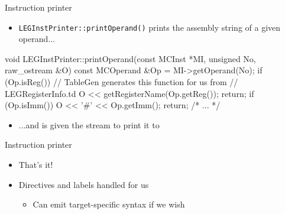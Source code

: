 
\begin{frame}[fragile]{Instruction printer}

\begin{itemize}
  \item \texttt{LEGInstPrinter::printOperand()} prints the assembly string of a given operand...
\end{itemize}

\begin{codebox}
void LEGInstPrinter::printOperand(const MCInst *MI, unsigned No,
                                  raw_ostream &O) {
  const MCOperand &Op = MI->getOperand(No);
  if (Op.isReg()) {
    // TableGen generates this function for us from   
    // LEGRegisterInfo.td
    O << getRegisterName(Op.getReg());
    return;
  }
  if (Op.isImm()) {
    O << '#' << Op.getImm();
    return;
  }
  /* ... */
}
\end{codebox}

\begin{itemize}
  \item ...and is given the stream to print it to
\end{itemize}

\end{frame}


\begin{frame}{Instruction printer}

\begin{itemize}
    \item That's it!
    \item Directives and labels handled for us
    \begin{itemize}
        \item Can emit target-specific syntax if we wish
    \end{itemize}
\end{itemize}


\end{frame}



